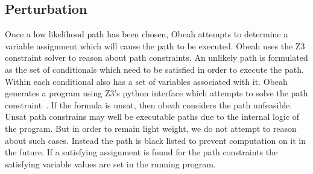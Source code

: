 \subsection{Perturbation}
\label{sec:runtime-pertubation}

Once a low likelihood path has been chosen, Obeah attempts to determine a
variable assignment which will cause the path to be executed. Obeah uses the Z3
constraint solver to reason about path constraints. An unlikely path is
formulated as the set of conditionals which need to be satisfied in order to
execute the path. Within each conditional also has a set of variables
associated with it. Obeah generates a program using Z3's python interface which
attempts to solve the path constraint~\cite{z3github}. If the formula is unsat,
then obeah considers the path unfeasible. Unsat path constrains may well be
executable paths due to the internal logic of the program. But in order to
remain light weight, we do not attempt to reason about such cases. Instead the
path is black listed to prevent computation on it in the future. If a
satisfying assignment is found for the path constraints the satisfying variable
values are set in the running program.

